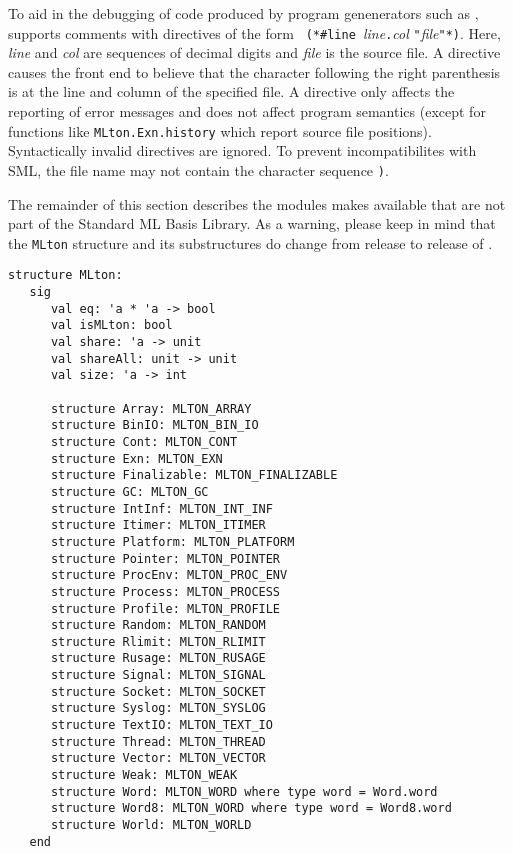 %

To aid in the debugging of code produced by program genenerators such as
,
{\mlton} supports comments with {\nline} directives of the form {\tt
(*\#line }{\it line}{\tt.}{\it col} {\tt "}{\it file}{\tt"*)}.  Here,
{\it line} and {\it col} are sequences of decimal digits and {\it
file} is the source file.  A {\nline} directive causes the front end
to believe that the character following the right parenthesis is at
the line and column of the specified file.  A {\nline} directive only
affects the reporting of error messages and does not affect program
semantics (except for functions like {\tt MLton.Exn.history} which
report source file positions).  Syntactically invalid {\nline}
directives are ignored.  To prevent incompatibilites with SML, the
file name may not contain the character sequence {\tt *)}.
%

The remainder of this section describes the modules {\mlton} makes
available that are not part of the Standard ML Basis Library.  As a
warning, please keep in mind that the {\tt MLton} structure and its
substructures do change from release to release of {\mlton}.

\begin{verbatim}
structure MLton:
   sig
      val eq: 'a * 'a -> bool
      val isMLton: bool
      val share: 'a -> unit
      val shareAll: unit -> unit
      val size: 'a -> int

      structure Array: MLTON_ARRAY
      structure BinIO: MLTON_BIN_IO
      structure Cont: MLTON_CONT
      structure Exn: MLTON_EXN
      structure Finalizable: MLTON_FINALIZABLE
      structure GC: MLTON_GC
      structure IntInf: MLTON_INT_INF
      structure Itimer: MLTON_ITIMER
      structure Platform: MLTON_PLATFORM
      structure Pointer: MLTON_POINTER
      structure ProcEnv: MLTON_PROC_ENV
      structure Process: MLTON_PROCESS
      structure Profile: MLTON_PROFILE
      structure Random: MLTON_RANDOM
      structure Rlimit: MLTON_RLIMIT
      structure Rusage: MLTON_RUSAGE
      structure Signal: MLTON_SIGNAL
      structure Socket: MLTON_SOCKET
      structure Syslog: MLTON_SYSLOG
      structure TextIO: MLTON_TEXT_IO
      structure Thread: MLTON_THREAD
      structure Vector: MLTON_VECTOR
      structure Weak: MLTON_WEAK
      structure Word: MLTON_WORD where type word = Word.word
      structure Word8: MLTON_WORD where type word = Word8.word
      structure World: MLTON_WORLD
   end
\end{verbatim}
%
